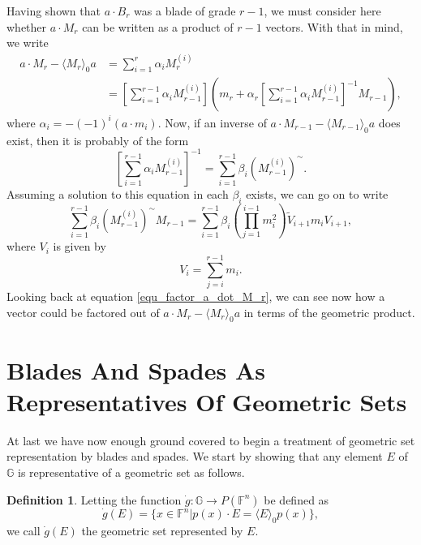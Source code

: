 \documentclass{birkjour}
\theoremstyle{definition}
\newtheorem{defn}[thm]{Definition}
\theoremstyle{remark}
\numberwithin{equation}{section}
\newcommand{\F}{\mathbb{F}}
\newcommand{\G}{\mathbb{G}}
\newcommand{\gd}{\dot{g}}
\begin{document}
Having shown that $a\cdot B_r$ was a blade of grade $r-1$, we must consider here whether $a\cdot M_r$ can be written
as a product of $r-1$ vectors.  With that in mind, we write
\begin{align}
a\cdot M_r - \langle M_r\rangle_0a &= \sum_{i=1}^r\alpha_i M_r^{(i)}\nonumber \\
 &= \left[\sum_{i=1}^{r-1}\alpha_iM_{r-1}^{(i)}\right]\left(m_r + \alpha_r\left[\sum_{i=1}^{r-1}\alpha_iM_{r-1}^{(i)}\right]^{-1}M_{r-1}\right),\label{equ_factor_a_dot_M_r}
\end{align}
where $\alpha_i=-(-1)^i(a\cdot m_i)$.  Now, if an inverse of $a\cdot M_{r-1}-\langle M_{r-1}\rangle_0a$ does exist, then
it is probably of the form
\begin{equation*}
\left[\sum_{i=1}^{r-1}\alpha_iM_{r-1}^{(i)}\right]^{-1} = \sum_{i=1}^{r-1}\beta_i\left(M_{r-1}^{(i)}\right)^{\sim}.
\end{equation*}
Assuming a solution to this equation in each $\beta_i$ exists, we can go on to write
\begin{equation*}
\sum_{i=1}^{r-1}\beta_i\left(M_{r-1}^{(i)}\right)^{\sim}M_{r-1} = \sum_{i=1}^{r-1}\beta_i \left(\prod_{j=1}^{i-1}m_i^2\right)\tilde{V}_{i+1}m_iV_{i+1},
\end{equation*}
where $V_i$ is given by
\begin{equation*}
V_i = \sum_{j=i}^{r-1} m_i.
\end{equation*}
Looking back at equation \eqref{equ_factor_a_dot_M_r}, we can see now how a vector could be factored
out of $a\cdot M_r - \langle M_r\rangle_0a$ in terms of the geometric product.

\section{Blades And Spades As Representatives Of Geometric Sets}

At last we have now enough ground covered to begin a treatment of geometric set representation by blades and spades.
We start by showing that any element $E$ of $\G$ is representative of a geometric set as follows.

\begin{defn}
Letting the function $\gd:\G\to P(\F^n)$ be defined as
\begin{equation*}
\gd(E) = \{x\in\F^n|p(x)\cdot E=\langle E\rangle_0p(x)\},
\end{equation*}
we call $\gd(E)$ the geometric set represented by $E$.
\end{defn}
\end{document}
